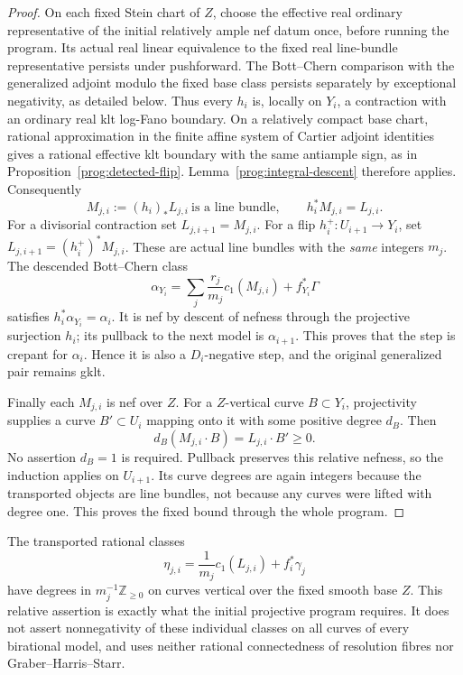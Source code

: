 \begin{proof}
On each fixed Stein chart of $Z$, choose the effective real
ordinary representative of the initial relatively ample nef
datum once, before running the program. Its actual real linear
equivalence to the fixed real line-bundle representative persists
under pushforward. The Bott--Chern comparison with the generalized
adjoint modulo the fixed base class persists separately by
exceptional negativity, as detailed below.
Thus every $h_i$ is, locally on $Y_i$, a contraction with an
ordinary real klt log-Fano boundary. On a relatively compact base
chart, rational approximation in the finite affine system of Cartier
adjoint identities gives a rational effective klt boundary with the
same antiample sign, as in Proposition~\ref{prog:detected-flip}.
Lemma~\ref{prog:integral-descent} therefore applies.
Consequently
\[
 M_{j,i}:=(h_i)_*L_{j,i}\ \text{is a line bundle},\qquad
 h_i^*M_{j,i}=L_{j,i}.
\]
For a divisorial contraction set $L_{j,i+1}=M_{j,i}$.
For a flip $h_i^+:U_{i+1}\to Y_i$, set
$L_{j,i+1}=(h_i^+)^*M_{j,i}$.
These are actual line bundles with the \emph{same} integers $m_j$.
The descended Bott--Chern class
\[
 \alpha_{Y_i}
     =\sum_j\frac{r_j}{m_j}c_1(M_{j,i})+f_{Y_i}^*\Gamma
\]
satisfies $h_i^*\alpha_{Y_i}=\alpha_i$.
It is nef by descent of nefness through the projective surjection
$h_i$; its pullback to the next model is $\alpha_{i+1}$.
This proves that the step is crepant for $\alpha_i$. Hence it is
also a $D_i$-negative step, and the original generalized pair
remains gklt.

Finally each $M_{j,i}$ is nef over $Z$. For a $Z$-vertical curve
$B\subset Y_i$, projectivity supplies a curve $B'\subset U_i$
mapping onto it with some positive degree $d_B$. Then
\[
 d_B(M_{j,i}\cdot B)=L_{j,i}\cdot B'\geq0.
\]
No assertion $d_B=1$ is required. Pullback preserves this relative
nefness, so the induction applies on $U_{i+1}$. Its curve degrees
are again integers because the transported objects are line
bundles, not because any curves were lifted with degree one.
This proves the fixed bound through the whole program.
\end{proof}

\begin{remark}
The transported rational classes
\[
 \eta_{j,i}=\frac1{m_j}c_1(L_{j,i})+f_i^*\gamma_j
\]
have degrees in $m_j^{-1}\mathbb Z_{\geq0}$ on curves vertical over
the fixed smooth base $Z$. This relative assertion is exactly what
the initial projective program requires. It does not assert
nonnegativity of these individual classes on all curves of every
birational model, and uses neither rational connectedness of
resolution fibres nor Graber--Harris--Starr.
\end{remark}

